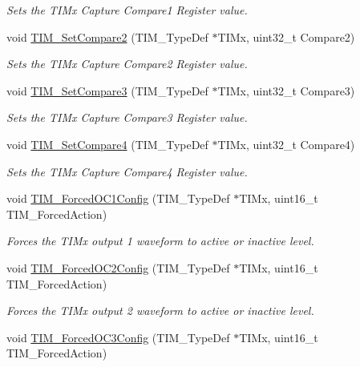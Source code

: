 \begin{DoxyCompactItemize}
\begin{DoxyCompactList}\small\item\em Sets the T\-I\-Mx Capture Compare1 Register value. \end{DoxyCompactList}\item 
void \hyperlink{group___t_i_m_ga3de36754f3ba5d46b9ef2bf8e77575c7}{T\-I\-M\-\_\-\-Set\-Compare2} (T\-I\-M\-\_\-\-Type\-Def $\ast$T\-I\-Mx, uint32\-\_\-t Compare2)
\begin{DoxyCompactList}\small\item\em Sets the T\-I\-Mx Capture Compare2 Register value. \end{DoxyCompactList}\item 
void \hyperlink{group___t_i_m_gac372fbbbbc20329802659dd6c6b4e051}{T\-I\-M\-\_\-\-Set\-Compare3} (T\-I\-M\-\_\-\-Type\-Def $\ast$T\-I\-Mx, uint32\-\_\-t Compare3)
\begin{DoxyCompactList}\small\item\em Sets the T\-I\-Mx Capture Compare3 Register value. \end{DoxyCompactList}\item 
void \hyperlink{group___t_i_m_ga99ba6c2afa87a239c9d32a49762b4245}{T\-I\-M\-\_\-\-Set\-Compare4} (T\-I\-M\-\_\-\-Type\-Def $\ast$T\-I\-Mx, uint32\-\_\-t Compare4)
\begin{DoxyCompactList}\small\item\em Sets the T\-I\-Mx Capture Compare4 Register value. \end{DoxyCompactList}\item 
void \hyperlink{group___t_i_m_ga4f58c12e6493a0d8b9555c9097b831d6}{T\-I\-M\-\_\-\-Forced\-O\-C1\-Config} (T\-I\-M\-\_\-\-Type\-Def $\ast$T\-I\-Mx, uint16\-\_\-t T\-I\-M\-\_\-\-Forced\-Action)
\begin{DoxyCompactList}\small\item\em Forces the T\-I\-Mx output 1 waveform to active or inactive level. \end{DoxyCompactList}\item 
void \hyperlink{group___t_i_m_ga3d2902b6fbab8dd55cd531055ffcc63d}{T\-I\-M\-\_\-\-Forced\-O\-C2\-Config} (T\-I\-M\-\_\-\-Type\-Def $\ast$T\-I\-Mx, uint16\-\_\-t T\-I\-M\-\_\-\-Forced\-Action)
\begin{DoxyCompactList}\small\item\em Forces the T\-I\-Mx output 2 waveform to active or inactive level. \end{DoxyCompactList}\item 
void \hyperlink{group___t_i_m_ga920b0fb4ca44fceffd1c3e441feebd8f}{T\-I\-M\-\_\-\-Forced\-O\-C3\-Config} (T\-I\-M\-\_\-\-Type\-Def $\ast$T\-I\-Mx, uint16\-\_\-t T\-I\-M\-\_\-\-Forced\-Action)

\end{DoxyCompactItemize}
